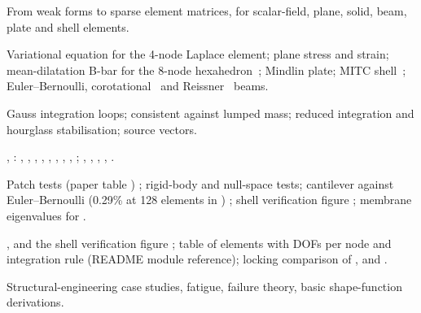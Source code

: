\begin{description}[style=nextline,leftmargin=1em]
\item[Focus] From weak forms to sparse element matrices, for scalar-field, plane, solid, beam, plate and shell elements.
\item[Mathematics] Variational equation for the 4-node Laplace element; plane stress and strain; mean-dilatation B-bar for the 8-node hexahedron~\cite{hughes1980bbar}; Mindlin plate; MITC shell~\cite{dvorkin1984}; Euler--Bernoulli, corotational~\cite{crisfield1990corot} and Reissner~\cite{simo1985beam} beams.
\item[Algorithm] Gauss integration loops; consistent against lumped mass; reduced integration and hourglass stabilisation; source vectors.
\item[Implementation] , : , , , , , , , , ; , , , , .
\item[Verification] Patch tests (paper table ) \have{}; rigid-body and null-space tests; cantilever against Euler--Bernoulli (0.29\% at 128 elements in ) \have{}; shell verification figure \have{}; membrane eigenvalues for  \have{}.
\item[Figures and tables] ,  and the shell verification figure \have{}; table of elements with DOFs per node and integration rule \have{} (README module reference); locking comparison of ,  and  .
\item[Exclusions] Structural-engineering case studies, fatigue, failure theory, basic shape-function derivations.
\end{description}

